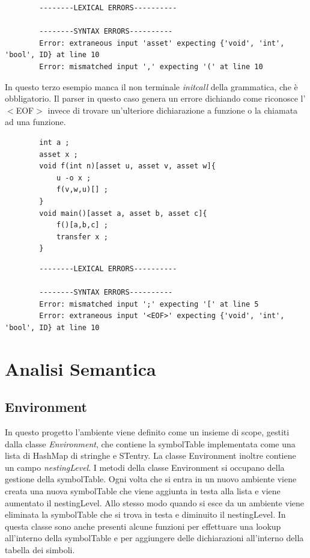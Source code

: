 \documentclass[12pt, a4paper]{report}
\begin{document}
    \begin{lstlisting}
        --------LEXICAL ERRORS----------

        --------SYNTAX ERRORS----------
        Error: extraneous input 'asset' expecting {'void', 'int', 'bool', ID} at line 10
        Error: mismatched input ',' expecting '(' at line 10
       \end{lstlisting}
   In questo terzo esempio manca il non terminale \emph{initcall} della grammatica, che è obbligatorio. Il parser in questo caso genera un errore dichiando come riconosce l'$<$EOF$>$ invece di trovare un'ulteriore dichiarazione a funzione o la chiamata ad una funzione.
    \begin{lstlisting}
        int a ; 
        asset x ;
        void f(int n)[asset u, asset v, asset w]{
            u -o x ;
            f(v,w,u)[] ;
        }
        void main()[asset a, asset b, asset c]{
            f()[a,b,c] ;
            transfer x ;
        }
    \end{lstlisting}
       \begin{lstlisting}
        --------LEXICAL ERRORS----------

        --------SYNTAX ERRORS----------
        Error: mismatched input ';' expecting '[' at line 5
        Error: extraneous input '<EOF>' expecting {'void', 'int', 'bool', ID} at line 10
       \end{lstlisting}    
 \chapter{Analisi Semantica}
 \section{Environment}
 In questo progetto l’ambiente viene definito come un insieme di scope, gestiti dalla classe \emph{Environment}, che contiene la symbolTable implementata come una lista di HashMap di stringhe e STentry. La classe Environment inoltre contiene un campo \emph{nestingLevel}. I metodi della classe Environment si occupano della gestione della symbolTable. Ogni volta che si entra in un nuovo ambiente viene creata una nuova symbolTable che viene aggiunta in testa alla lista e viene aumentato il nestingLevel. Allo stesso modo quando si esce da un ambiente viene eliminata la symbolTable che si trova in testa e diminuito il nestingLevel. In questa classe sono anche presenti alcune funzioni per effettuare una lookup all'interno della symbolTable e per aggiungere delle dichiarazioni all'interno della tabella dei simboli. 
\end{document}
